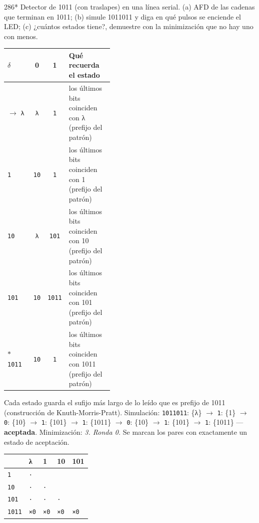 \documentclass[11pt]{article}
\begin{document}
\begin{ejercicio}{286}{*}
Detector de 1011 (con traslapes) en una línea serial. (a) AFD de las cadenas que terminan en 1011; (b) simule 1011011 y diga en qué pulsos se enciende el LED; (c) ¿cuántos estados tiene?, demuestre con la minimización que no hay uno con menos.
\end{ejercicio}
\proc \begin{center}\small\begin{tabular}{lccp{0.42\linewidth}}\toprule
$\delta$ & 0 & 1 & Qué recuerda el estado \\\midrule
$\to$ \texttt{λ} & \texttt{λ} & \texttt{1} & los últimos bits coinciden con λ (prefijo del patrón) \\
 \texttt{1} & \texttt{10} & \texttt{1} & los últimos bits coinciden con 1 (prefijo del patrón) \\
 \texttt{10} & \texttt{λ} & \texttt{101} & los últimos bits coinciden con 10 (prefijo del patrón) \\
 \texttt{101} & \texttt{10} & \texttt{1011} & los últimos bits coinciden con 101 (prefijo del patrón) \\
$*$ \texttt{1011} & \texttt{10} & \texttt{1} & los últimos bits coinciden con 1011 (prefijo del patrón) \\
\bottomrule\end{tabular}\end{center}
Cada estado guarda el sufijo más largo de lo leído que es prefijo de 1011 (construcción de Knuth-Morris-Pratt). Simulación: \texttt{1011011}: \{λ\} $\to$ \texttt{1}: \{1\} $\to$ \texttt{0}: \{10\} $\to$ \texttt{1}: \{101\} $\to$ \texttt{1}: \{1011\} $\to$ \texttt{0}: \{10\} $\to$ \texttt{1}: \{101\} $\to$ \texttt{1}: \{1011\} — \textbf{aceptada}. Minimización: \textit{3. Ronda 0.} Se marcan los pares con exactamente un estado de aceptación.
\begin{center}\footnotesize\begin{tabular}{lllll}\toprule
 & λ & 1 & 10 & 101 \\\midrule
\texttt{1} & \texttt{·} & \texttt{} & \texttt{} & \texttt{} \\
\texttt{10} & \texttt{·} & \texttt{·} & \texttt{} & \texttt{} \\
\texttt{101} & \texttt{·} & \texttt{·} & \texttt{·} & \texttt{} \\
\texttt{1011} & \texttt{×0} & \texttt{×0} & \texttt{×0} & \texttt{×0} \\
\bottomrule\end{tabular}\end{center}
\end{document}
